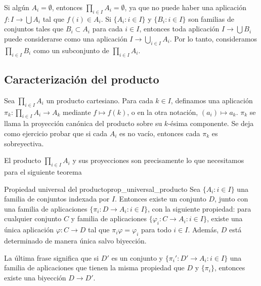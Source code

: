 Si algún $A_i = \emptyset$, entonces $\prod_{i \in I} A_i = \emptyset$, ya que no puede haber una aplicación $f: I \to \bigcup A_i$ tal que $f(i) \in A_i$. Si $\{A_i : i \in I\}$ y $\{B_i : i \in I\}$ son familias de conjuntos tales que $B_i \subset A_i$ para cada $i \in I$, entonces toda aplicación $I \to \bigcup B_i$ puede considerarse como una aplicación $I \to \bigcup_{i \in I} A_i$. Por lo tanto, consideramos $\prod_{i \in I} B_i$ como un subconjunto de $\prod_{i \in I} A_i$.

\subsection{Caracterización del producto}

Sea $\prod_{i \in I} A_i$ un producto cartesiano. Para cada $k \in I$, definamos una aplicación $\pi_k: \prod_{i \in I} A_i \to A_k$ mediante $f \mapsto f(k)$, o en la otra notación, $(a_i) \mapsto a_k$. $\pi_k$ se llama la {proyección canónica} del producto sobre su $k$-ésima componente. Se deja como ejercicio probar que si cada $A_i$ es no vacío, entonces cada $\pi_k$ es sobreyectiva.

El producto $\prod_{i \in I} A_i$ y sus proyecciones son precisamente lo que necesitamos para el siguiente teorema

\begin{theorem}{Propiedad universal del producto}{prop_universal_producto}
    Sea $\{A_i : i \in I\}$ una familia de conjuntos indexada por $I$. Entonces existe un conjunto $D$, junto con una familia de aplicaciones $\{\pi_i: D \to A_i : i \in I\}$, con la siguiente propiedad: para cualquier conjunto $C$ y familia de aplicaciones $\{\varphi_i: C \to A_i : i \in I\}$, existe una única aplicación $\varphi: C \to D$ tal que $\pi_i \varphi = \varphi_i$ para todo $i \in I$. Además, $D$ está determinado de manera única salvo biyección.
\end{theorem}

La última frase significa que si $D'$ es un conjunto y $\{\pi_i': D' \to A_i : i \in I\}$ una familia de aplicaciones que tienen la misma propiedad que $D$ y $\{\pi_i\}$, entonces existe una biyección $D \to D'$.

